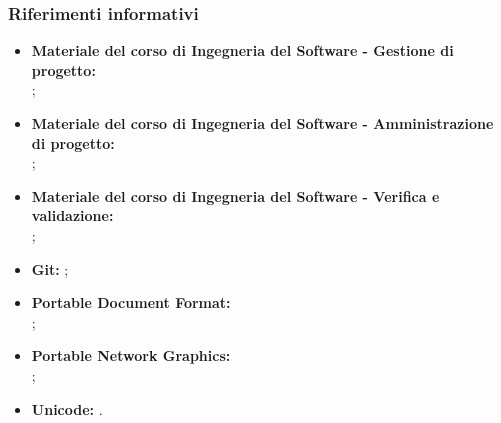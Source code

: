 		\subsubsection{Riferimenti informativi}
			\begin{itemize}
				\item \textbf{Materiale del corso di Ingegneria del Software - Gestione di progetto:} \\
					;
				\item \textbf{Materiale del corso di Ingegneria del Software - Amministrazione di progetto:} \\
					;
				\item \textbf{Materiale del corso di Ingegneria del Software - Verifica e validazione:} \\
					;
				\item \textbf{Git:} ;
				\item \textbf{Portable Document Format:} \\
					;
				\item \textbf{Portable Network Graphics:} \\
					;
				\item \textbf{Unicode:} .
			\end{itemize}

